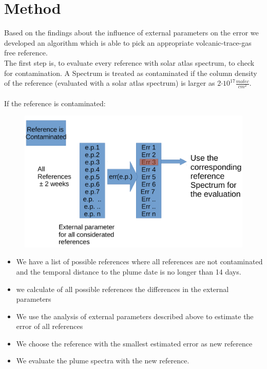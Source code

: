 \documentclass  [
  paper    = a4,
  BCOR     = 10mm,
  twoside,
  fontsize = 12pt,
  fleqn,
  toc      = bibnumbered,
  toc      = listofnumbered,
  numbers  = noendperiod,
  headings = normal,
  listof   = leveldown,
  version  = 3.03
]                                       {scrreprt}
\begin{document}
	\chapter{Method}
	Based on the findings about the influence of external parameters on the  error we developed an algorithm which is able to pick an appropriate volcanic-trace-gas free reference.\\ 
	The first step is, to evaluate every reference with solar atlas spectrum, to check for contamination.	A Spectrum is treated as contaminated if the  column density of the reference (evaluated with a solar atlas spectrum) is larger as 2$\cdot 10^{17}\frac{molec}{cm^2}$.\\
	\\
	If the reference is contaminated:
	\begin{figure}
\centering
\includegraphics[width=0.7\linewidth]{Bilder/Cont}
\caption{}
\label{fig:Cont}
\end{figure}

	\begin{itemize}
		\item We have a list of possible references where all references are not contaminated and the temporal distance to the plume date is no longer than 14 days.
		\item we calculate of all possible references the differences in the external parameters
		\item We use the analysis of external parameters described above to estimate the  error of all references
		\item We choose the reference with the smallest estimated  error as new reference
		\item We evaluate the plume spectra with the new reference.
	\end{itemize}
\end{document}
